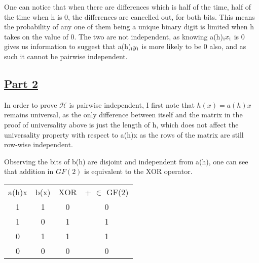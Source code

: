 \documentclass[11pt]{article}
\begin{document}
\begin{flushleft}
One can notice that when there are differences which is half of the time, half of the time when h is 0, the differences are cancelled out, for both bits. This means the probability of any one of them being a unique binary digit is limited when h takes on the value of 0. The two are not independent, as knowing a(h)$\textsubscript{i}x\textsubscript{i}$ is 0 gives us information to suggest that a(h)$\textsubscript{i}y\textsubscript{i}$ is more likely to be 0 also, and as such it cannot be pairwise independent.

\subsection{\underline{Part 2}}

In order to prove $\mathcal{H}$ is pairwise independent, I first note that $h(x) = a(h)x$ remains universal, as the only difference between itself and the matrix in the proof of universality above is just the length of h, which does not affect the universality property with respect to a(h)x as the rows of the matrix are still row-wise independent.

Observing the bits of b(h) are disjoint and independent from a(h), one can see that addition in $GF(2)$ is equivalent to the XOR operator.

\begin{center}
\begin{tabular}{ |c|c|c|c| } 
 \hline
 a(h)x & b(x) & XOR & + $\in$ GF(2) \\ 
 1 & 1 & 0 & 0 \\ 
 1 & 0 & 1 & 1 \\ 
 0 & 1 & 1 & 1 \\ 
 0 & 0 & 0 & 0 \\ 
 \hline
\end{tabular}
\end{center}


\end{flushleft}
\end{document}
